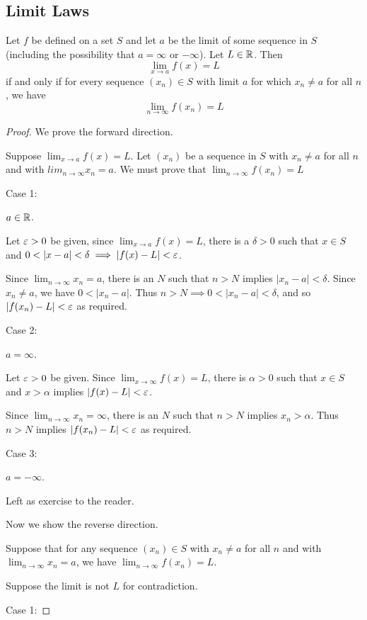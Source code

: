 \documentclass{article}
\begin{document}
\subsection{Limit Laws}
\begin{theorem}
Let $f$ be defined on a set $S$ and let $a$ be the limit of some sequence in $S$ (including the possibility that $a = \infty$ or $-\infty$). Let $L \in \mathbb{R}$. Then \[
\lim_{x\to a}f(x) = L
\]
if and only if for every sequence $(x_n) \in S$ with limit $a$ for which $x_n \neq a$ for all $n$, we have \[
\lim_{n\to\infty} f(x_n) = L
\]
\end{theorem}
\begin{proof}
We prove the forward direction.

Suppose $\lim_{x\to a} f(x) = L$. Let $(x_n)$ be a sequence in $S$ with $x_n \neq a$ for all $n$ and with $lim_{n\to\infty} x_n = a$. We must prove that $\lim_{n\to\infty} f(x_n) = L$

Case 1:

$a \in \mathbb{R}$. 

Let $\varepsilon > 0$ be given, since $\lim_{x\to a} f(x) = L$, there is a $\delta > 0$ such that $x \in S$ and $0 < |x-a| < \delta \implies |f(x) - L| < \varepsilon$.

Since $\lim_{n\to\infty} x_n = a$, there is an $N$ such that $n > N$ implies $|x_n - a| < \delta$.
Since $x_n \neq a$, we have $0 < |x_n - a|$. Thus $n > N \implies 0 < |x_n-a| < \delta$, and so $|f(x_n) - L| < \varepsilon$ as required.

Case 2:

$a = \infty$.

Let $\varepsilon > 0$ be given. Since $\lim_{x\to \infty} f(x) = L$, there is $\alpha > 0$ such that $x \in S$ and $x > \alpha$ implies $|f(x) - L| < \varepsilon$.

Since $\lim_{n\to\infty} x_n = \infty$, there is an $N$ such that $n > N$ implies $x_n > \alpha$. Thus $n > N$ implies $|f(x_n) - L| < \varepsilon$ as required.

Case 3:

$a = -\infty$.

Left as exercise to the reader.

Now we show the reverse direction.

Suppose that for any sequence $(x_n) \in S$ with $x_n \neq a$ for all $n$ and with $\lim_{n\to\infty} x_n = a$, we have $\lim_{n\to\infty} f(x_n) = L$.

Suppose the limit is not $L$ for contradiction.

Case 1:


\end{proof}
\end{document}
